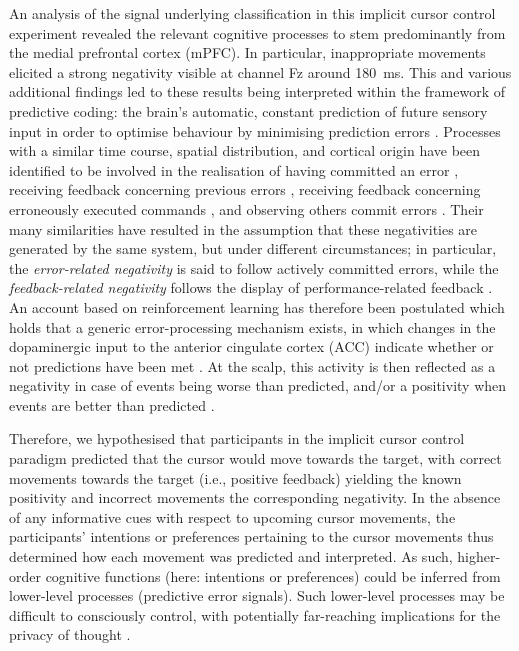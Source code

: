 An analysis of the signal underlying classification in this implicit cursor control experiment revealed the relevant cognitive processes to stem predominantly from the medial prefrontal cortex (mPFC). In particular, inappropriate movements elicited a strong negativity visible at channel Fz around 180~ms. This and various additional findings led to these results being interpreted within the framework of predictive coding: the brain's automatic, constant prediction of future sensory input in order to optimise behaviour by minimising prediction errors \cite{friston2010free,clark2013predictive}. Processes with a similar time course, spatial distribution, and cortical origin have been identified to be involved in the realisation of having committed an error \cite{falkenstein1990,falkenstein2000}, receiving feedback concerning previous errors \cite{miltner1997,holroyd2003frn}, receiving feedback concerning erroneously executed commands \cite{ferrez2008simulated,mousavi2017mi}, and observing others commit errors \cite{miltner2004,schie2004}. Their many similarities have resulted in the assumption that these negativities are generated by the same system, but under different circumstances; in particular, the \emph{error-related negativity} is said to follow actively committed errors, while the \emph{feedback-related negativity} follows the display of performance-related feedback \cite{walsh2012frnreview}. An account based on reinforcement learning has therefore been postulated which holds that a generic error-processing mechanism exists, in which changes in the dopaminergic input to the anterior cingulate cortex (ACC) indicate whether or not predictions have been met \cite{holroyd2002,nieuwenhuis2004rlern}. At the scalp, this activity is then reflected as a negativity in case of events being worse than predicted, and/or a positivity when events are better than predicted \cite{holroyd2008rewardpositivity}. 

Therefore, we hypothesised that participants in the implicit cursor control paradigm predicted that the cursor would move towards the target, with correct movements towards the target (i.e., positive feedback) yielding the known positivity and incorrect movements the corresponding negativity. In the absence of any informative cues with respect to upcoming cursor movements, the participants' intentions or preferences pertaining to the cursor movements thus determined how each movement was predicted and interpreted. As such, higher-order cognitive functions (here: intentions or preferences) could be inferred from lower-level processes (predictive error signals). Such lower-level processes may be difficult to consciously control, with potentially far-reaching implications for the privacy of thought \cite{mecacci2019criteria}.

